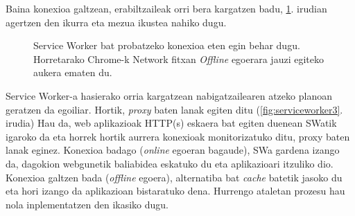 Baina konexioa galtzean, erabiltzaileak orri bera kargatzen badu, \ref{fig:serviceworker2}. irudian agertzen den ikurra eta mezua ikustea nahiko dugu.

\begin{figure}[ht]
	\centering
{}
\caption{Service Worker bat probatzeko konexioa eten egin behar dugu. Horretarako Chrome-k Network fitxan \textit{Offline} egoerara jauzi egiteko aukera ematen du.}
\label{fig:serviceworker2}
\end{figure}

Service Worker-a hasierako orria kargatzean nabigatzailearen atzeko planoan geratzen da egoiliar. Hortik,  \textit{proxy} baten lanak egiten ditu (\ref{fig:serviceworker3}. irudia) Hau da, web aplikazioak HTTP(s) eskaera bat egiten duenean SWatik igaroko da eta horrek hortik aurrera konexioak monitorizatuko ditu, proxy baten lanak eginez. Konexioa badago (\textit{online} egoeran bagaude), SWa gardena izango da, dagokion webgunetik baliabidea eskatuko du eta aplikazioari itzuliko dio. Konexioa galtzen bada (\textit{offline} egoera), alternatiba bat \textit{cache} batetik jasoko du eta hori izango da aplikazioan bistaratuko dena. Hurrengo ataletan prozesu hau nola inplementatzen den ikasiko dugu.

